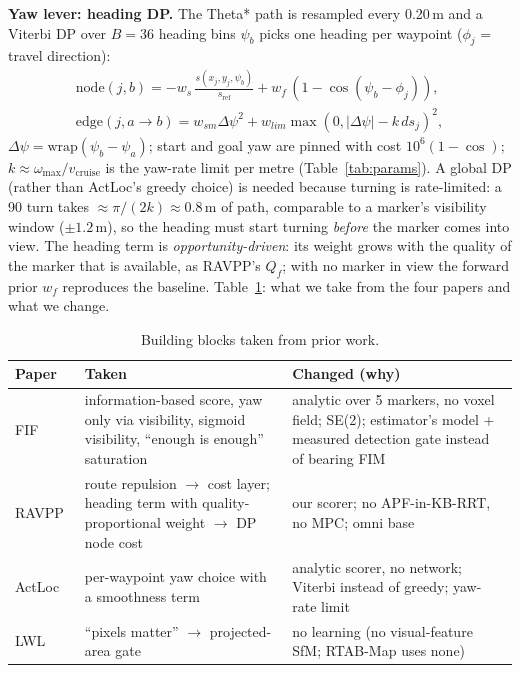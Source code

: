 \documentclass[10pt,twocolumn]{article}
\begin{document}
\textbf{Yaw lever: heading DP.} The Theta* path is resampled every 0.20\,m and a Viterbi DP over $B=36$ heading bins $\psi_b$ picks one heading per waypoint ($\phi_j$ = travel direction):
\begin{gather}
\mathrm{node}(j,b)=-w_s\,\frac{s(x_j,y_j,\psi_b)}{s_{\mathrm{ref}}}+w_f\,(1-\cos(\psi_b-\phi_j)),\nonumber\\
\mathrm{edge}(j,a{\to}b)=w_{sm}\Delta\psi^2+w_{lim}\max(0,|\Delta\psi|-k\,ds_j)^2,
\end{gather}
$\Delta\psi=\mathrm{wrap}(\psi_b-\psi_a)$; start and goal yaw are pinned with cost $10^6(1-\cos)$; $k\approx\omega_{\max}/v_{\mathrm{cruise}}$ is the yaw-rate limit per metre (Table~\ref{tab:params}).
A global DP (rather than ActLoc's greedy choice) is needed because turning is rate-limited: a 90\textdegree{} turn takes $\approx\pi/(2k)\approx0.8$\,m of path, comparable to a marker's visibility window ($\pm1.2$\,m), so the heading must start turning \emph{before} the marker comes into view.
The heading term is \emph{opportunity-driven}: its weight grows with the quality of the marker that is available, as RAVPP's $Q_f$; with no marker in view the forward prior $w_f$ reproduces the baseline. Table~\ref{tab:papers}: what we take from the four papers and what we change.
\begin{table}[t]
\centering\footnotesize
\caption{Building blocks taken from prior work.}
\label{tab:papers}
\begin{tabularx}{\columnwidth}{@{}l>{\raggedright\arraybackslash}X>{\raggedright\arraybackslash}X@{}}
\toprule
Paper & Taken & Changed (why) \\
\midrule
FIF~\cite{fif} & information-based score, yaw only via visibility, sigmoid visibility, ``enough is enough'' saturation & analytic over 5 markers, no voxel field; SE(2); estimator's model + measured detection gate instead of bearing FIM \\
RAVPP~\cite{ravpp} & route repulsion $\to$ cost layer; heading term with quality-proportional weight $\to$ DP node cost & our scorer; no APF-in-KB-RRT, no MPC; omni base \\
ActLoc~\cite{actloc} & per-waypoint yaw choice with a smoothness term & analytic scorer, no network; Viterbi instead of greedy; yaw-rate limit \\
LWL~\cite{lwl} & ``pixels matter'' $\to$ projected-area gate & no learning (no visual-feature SfM; RTAB-Map uses none) \\
\bottomrule
\end{tabularx}
\end{table}
\end{document}
